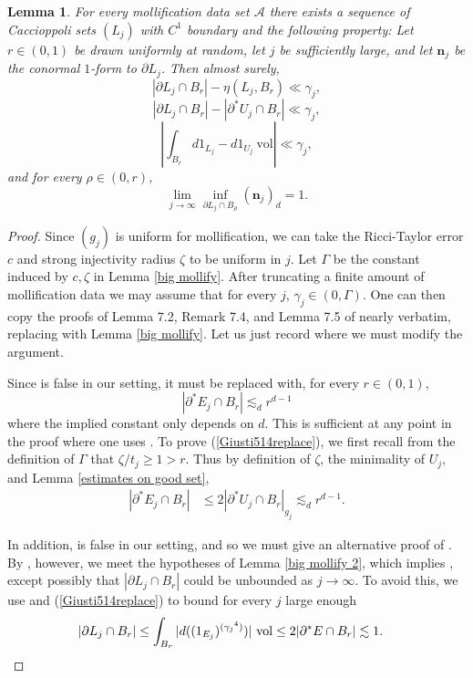 \documentclass[reqno,12pt,letterpaper]{amsart}
\newcommand{\normal}{\mathbf n}
\newcommand{\vol}{\mathrm{vol}}
\newtheorem{lemma}[theorem]{Lemma}
\theoremstyle{definition}
\numberwithin{equation}{section}
\begin{document}
\begin{lemma}\label{big mollify 3}
For every mollification data set $\mathcal A$ there exists a sequence of Caccioppoli sets $(L_j)$ with $C^1$ boundary and the following property:
Let $r \in (0, 1)$ be drawn uniformly at random, let $j$ be sufficiently large, and let $\normal_j$ be the conormal $1$-form to $\partial L_j$.
Then almost surely,
$$|\partial L_j \cap B_r| - \eta(L_j, B_r) \ll \gamma_j,$$
$$|\partial L_j \cap B_r| - |\partial^* U_j \cap B_r| \ll \gamma_j,$$
$$\left|\int_{B_r} d1_{L_j} - d1_{U_j} ~\vol\right| \ll \gamma_j,$$
and for every $\rho \in (0, r)$,
$$\lim_{j \to \infty} \inf_{\partial L_j \cap B_\rho} (\normal_j)_d = 1.$$
\end{lemma}
\begin{proof}
Since $(g_j)$ is uniform for mollification, we can take the Ricci-Taylor error $c$ and strong injectivity radius $\zeta$ to be uniform in $j$.
Let $\Gamma$ be the constant induced by $c,\zeta$ in Lemma \ref{big mollify}.
After truncating a finite amount of mollification data we may assume that for every $j$, $\gamma_j \in (0, \Gamma)$.
One can then copy the proofs of Lemma 7.2, Remark 7.4, and Lemma 7.5 of \cite{Giusti77} nearly verbatim, replacing \cite[Lemma 7.3]{Giusti77} with Lemma \ref{big mollify}.
Let us just record where we must modify the argument.

Since \cite[(5.14)]{Giusti77} is false in our setting, it must be replaced with, for every $r \in (0, 1)$,
\begin{equation}\label{Giusti514replace}
|\partial^* E_j \cap B_r| \lesssim_d r^{d - 1}
\end{equation}
where the implied constant only depends on $d$.
This is sufficient at any point in the proof where one uses \cite[(5.14)]{Giusti77}.
To prove (\ref{Giusti514replace}), we first recall from the definition of $\Gamma$ that $\zeta/t_j \geq 1 > r$.
Thus by definition of $\zeta$, the minimality of $U_j$, and Lemma \ref{estimates on good set},
\begin{align*}
|\partial^* E_j \cap B_r| &\leq 2|\partial^* U_j \cap B_r|_{g_j} \lesssim_d r^{d - 1}.
\end{align*}

In addition, \cite[(5.5)]{Giusti77} is false in our setting, and so we must give an alternative proof of \cite[(7.24)]{Giusti77}.
By \cite[(7.23)]{Giusti77}, however, we meet the hypotheses of Lemma \ref{big mollify 2}, which implies \cite[(7.24)]{Giusti77}, except possibly that $|\partial L_j \cap B_r|$ could be unbounded as $j \to \infty$.
To avoid this, we use \cite[(7.20-7.21)]{Giusti77} and (\ref{Giusti514replace}) to bound for every $j$ large enough
\begin{align*}
|\partial L_j \cap B_r| &\leq \int_{B_r} |d((1_{E_j})^{({\gamma_j}^4)})| ~\vol \leq 2|\partial^*E \cap B_r| \lesssim 1. \qedhere
\end{align*}
\end{proof}
\end{document}
